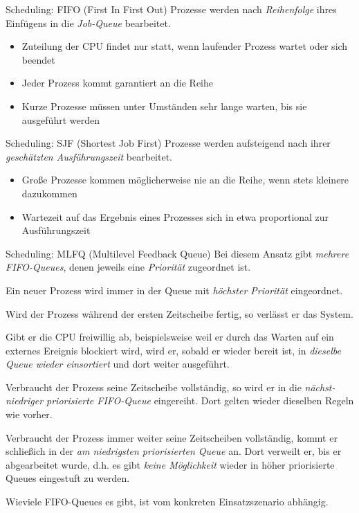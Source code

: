 \begin{algo}{Scheduling: FIFO (First In First Out)}
    Prozesse werden nach \emph{Reihenfolge} ihres Einfügens in die \emph{Job-Queue} bearbeitet.
    \begin{itemize}
        \item Zuteilung der CPU findet nur statt, wenn laufender Prozess wartet oder sich beendet
        \item Jeder Prozess kommt garantiert an die Reihe
        \item Kurze Prozesse müssen unter Umständen sehr lange warten, bis sie ausgeführt werden
    \end{itemize}
\end{algo}

\begin{algo}{Scheduling: SJF (Shortest Job First)}
    Prozesse werden aufsteigend nach ihrer \emph{geschätzten Ausführungszeit} bearbeitet.
    \begin{itemize}
        \item Große Prozesse kommen möglicherweise nie an die Reihe, wenn stets kleinere dazukommen
        \item Wartezeit auf das Ergebnis eines Prozesses sich in etwa proportional zur Ausführungszeit
    \end{itemize}
\end{algo}

\begin{algo}{Scheduling: MLFQ (Multilevel Feedback Queue)}
    Bei diesem Ansatz gibt \emph{mehrere FIFO-Queues}, denen jeweils
    eine \emph{Priorität} zugeordnet ist.

    Ein neuer Prozess wird immer in der Queue mit
    \emph{höchster Priorität} eingeordnet.

    Wird der Prozess während der ersten Zeitscheibe fertig,
    so verlässt er das System.

    Gibt er die CPU freiwillig ab, beispielsweise weil er
    durch das Warten auf ein externes Ereignis blockiert wird, wird er, sobald er wieder
    bereit ist, in \emph{dieselbe Queue wieder einsortiert} und dort weiter ausgeführt.

    Verbraucht der Prozess seine Zeitscheibe vollständig, so wird er in die \emph{nächst-niedriger priorisierte FIFO-Queue} eingereiht. Dort gelten wieder dieselben Regeln wie vorher.

    Verbraucht der Prozess immer weiter seine Zeitscheiben vollständig, kommt er
    schließich in der \emph{am niedrigsten priorisierten Queue} an.
    Dort verweilt er, bis er abgearbeitet wurde, d.h. es gibt \emph{keine Möglichkeit} wieder in höher priorisierte Queues
    eingestuft zu werden.

    Wieviele FIFO-Queues es gibt, ist vom konkreten Einsatzszenario abhängig.
\end{algo}

